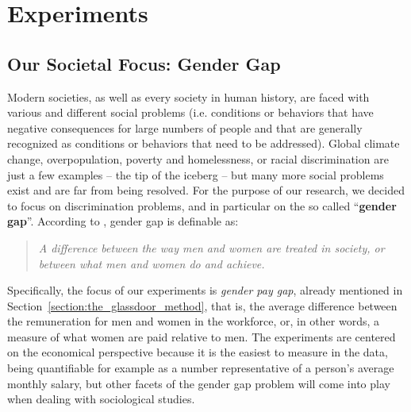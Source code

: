 \chapter{Experiments}
\label{capitolo4}
\thispagestyle{empty}

\section{Our Societal Focus: Gender Gap}
Modern societies, as well as every society in human history, are faced with various and different social problems (i.e. conditions or behaviors that have negative consequences for large numbers of people and that are generally recognized as conditions or behaviors that need to be addressed). Global climate change, overpopulation, poverty and homelessness, or racial discrimination are just a few examples -- the tip of the iceberg -- but many more social problems exist and are far from being resolved. For the purpose of our research, we decided to focus on discrimination problems, and in particular on the so called ``\textbf{gender gap}''. According to \cite{cambridge2013gender}, gender gap is definable as:
\begin{quote}\emph{A difference between the way men and women are treated in society, or between what men and women do and achieve.} \cite{cambridge2013gender}\end{quote}
Specifically, the focus of our experiments is \textit{gender pay gap}, already mentioned in Section~\ref{section:the_glassdoor_method}, that is, the average difference between the remuneration for men and women in the workforce, or, in other words, a measure of what women are paid relative to men. The experiments are centered on the economical perspective because it is the easiest to measure in the data, being quantifiable for example as a number representative of a person's average monthly salary, but other facets of the gender gap problem will come into play when dealing with sociological studies.


